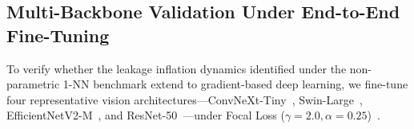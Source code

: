 \documentclass[a4paper,fleqn]{cas-sc}
\begin{document}
\begin{table}[pos=htbp]
\centering
\small
\setlength{\tabcolsep}{4pt}
\renewcommand{\arraystretch}{1.18}
\caption{Feature extractor ablation under zero-training 1-NN evaluation on frozen representations across four distinct architectural paradigms (Mean $\pm$ Std across 5 seeds; $CCR=100\%$).}
\label{tab:feature_extractor_ablation}
\end{table}

\subsection{Multi-Backbone Validation Under End-to-End Fine-Tuning}
\label{sec:finetuning}
To verify whether the leakage inflation dynamics identified under the non-parametric 1-NN benchmark extend to gradient-based deep learning, we fine-tune four representative vision architectures—ConvNeXt-Tiny~\cite{convnext}, Swin-Large~\cite{swin}, EfficientNetV2-M~\cite{efficientnetv2}, and ResNet-50~\cite{resnet}—under Focal Loss ($\gamma=2.0, \alpha=0.25$)~\cite{focal}. 
\end{document}
